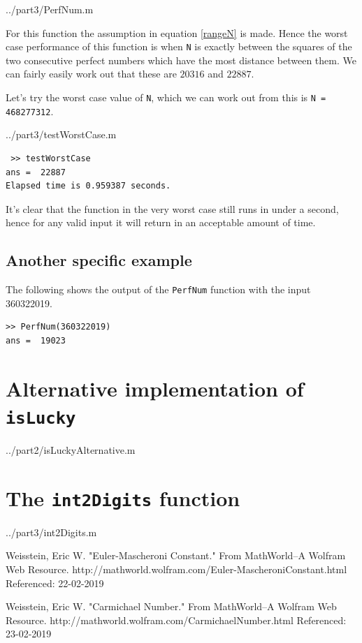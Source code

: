 \documentclass[10pt]{article}
\begin{document}
  {../part3/PerfNum.m}
 
For this function the assumption in equation \ref{rangeN} is made. Hence the worst case performance of this function is when \texttt{N} is exactly between the squares of the two consecutive perfect numbers which have the most distance between them. We can fairly easily work out that these are $20316$ and $22887$. 

Let's try the worst case value of \texttt{N}, which we can work out from this is \texttt{N = 468277312}.

   {../part3/testWorstCase.m}
  
 \begin{verbatim}
 >> testWorstCase
ans =  22887
Elapsed time is 0.959387 seconds.
\end{verbatim}

It's clear that the function in the very worst case still runs in under a second, hence for any valid input it will return in an acceptable amount of time.

\subsection{Another specific example}

The following shows the output of the \texttt{PerfNum} function with the input 360322019.

\begin{verbatim}
>> PerfNum(360322019)
ans =  19023
\end{verbatim}
\begin{appendices}


\section{Alternative implementation of \texttt{isLucky}}\label{islucky_appendix}

   {../part2/isLuckyAlternative.m}
  
\section{The \texttt{int2Digits} function}

   {../part3/int2Digits.m}

\end{appendices}

\begin{thebibliography}{9}
Weisstein, Eric W. "Euler-Mascheroni Constant." From MathWorld--A Wolfram Web Resource. http://mathworld.wolfram.com/Euler-MascheroniConstant.html
Referenced: 22-02-2019

Weisstein, Eric W. "Carmichael Number." From MathWorld--A Wolfram Web Resource. http://mathworld.wolfram.com/CarmichaelNumber.html
Referenced: 23-02-2019

\end{thebibliography}
\end{document}
